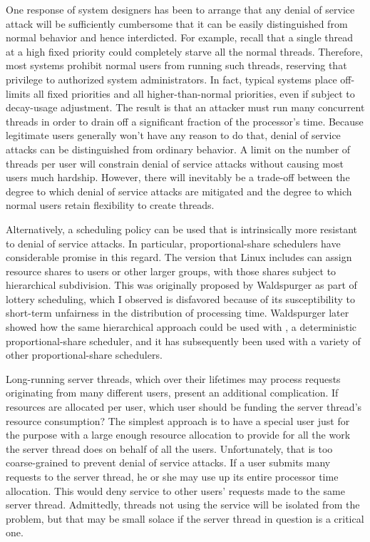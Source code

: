 One response of system designers has been to arrange that any denial
of service attack will be sufficiently cumbersome that it can be
easily distinguished from normal behavior and hence interdicted.  For
example, recall that a single thread at a high fixed priority could
completely starve all the normal threads.  Therefore, most systems
prohibit normal users from running such threads, reserving that
privilege to authorized system administrators.  In fact, typical
systems place off-limits all fixed priorities and all higher-than-normal priorities, even if subject to decay-usage adjustment.  The
result is that an attacker must run many concurrent threads in order
to drain off a significant fraction of the processor's time.  Because
legitimate users generally won't have any reason to do that,
denial of service attacks can be distinguished from ordinary behavior.
A
limit on the number of threads per user will constrain denial of service attacks
without causing most users much
hardship.  However, there will inevitably be a trade-off between the degree to
which denial of service attacks are mitigated and the degree to which
normal users retain flexibility to create threads.

Alternatively, a scheduling policy can be used that is intrinsically
more resistant to denial of service attacks.  In particular,
proportional-share schedulers have considerable promise in this
regard.  The version that Linux includes can assign resource shares to
users or other larger groups, with those shares subject to
hierarchical subdivision.  This was
originally proposed by Waldspurger as part
of lottery scheduling, which I
observed is disfavored because of its susceptibility to short-term
unfairness in the
distribution of processing time.  Waldspurger later showed
how the same hierarchical approach could be used with
, a deterministic proportional-share
scheduler, and it has subsequently been used with a variety of other proportional-share schedulers.

Long-running server threads, which over their lifetimes may process
requests originating from many different users, present an additional
complication.  If resources are allocated per user, which user should
be funding the server thread's resource consumption?  The simplest
approach is to have a special user just for the purpose with a large
enough resource allocation to provide for all the work the server
thread does on behalf of all the users.  Unfortunately, that is too
coarse-grained to prevent denial of service attacks.  If a user
submits many requests to the server thread, he or she may use up its entire
processor time allocation. This would deny service to other users' requests
made to the same server thread.  Admittedly,
threads not using the service will be isolated from the problem, but that may be small
solace if the server thread in question is a critical one.


